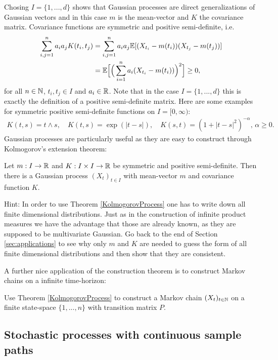 Chosing $I=\{1,...,d\}$ shows that Gaussian processes are direct generalizations of Gaussian vectors and in this case $m$ is the mean-vector and $K$ the covariance matrix. Covariance functions are symmetric and positive semi-definite, i.e.
\begin{align*}
	\sum_{i,j=1}^na_ia_jK(t_i,t_j)&=\sum_{i,j=1}^n a_ia_j \mathbb{E}[(X_{t_i}-m(t_i))(X_{t_j}-m(t_j))]\\
	&=\mathbb{E}\Big[\Big(\sum_{i=1}^n a_i(X_{t_i}-m(t_i))\Big)^2 \Big]\geq 0,
\end{align*}
for all $n\in\mathbb{N}$, $t_i, t_j\in I$ and $a_i\in \mathbb{R}$. Note that in the case $I=\{1,...,d\}$ this is exactly the definition of a positive semi-definite matrix. Here are some examples for symmetric  positive semi-definite functions on $I=[0,\infty)$:
\begin{align*}
	K(t,s)=t\wedge s, \quad K(t,s)=\exp(|t-s|),\quad K(s,t)=(1+|t-s|^2)^{-\alpha},\,\alpha\geq 0.
\end{align*}
	Gaussian processes are particularly useful as they are easy to construct through Kolmogorov's extension theorem:
\begin{luebung}
	Let $m:I\to \mathbb{R}$ and $K:I\times I\to \mathbb{R}$ be symmetric and positive semi-definite. Then there is a Gaussian process $(X_t)_{t\in I}$ with mean-vector $m$ and covariance function $K$.\smallskip

	Hint: In order to use Theorem \ref{KolmogorovProcess} one has to write down all finite dimensional distributions. Just as in the construction of infinite product measures we have the advantage that those are already known, as they are supposed to be multivariate Gaussian. Go back to the end of Section \ref{sec:applications} to see why only $m$ and $K$ are needed to guess the form of all finite dimensional distributions and then show that they are consistent.
\end{luebung}
A further nice application of the construction theorem is to construct Markov chains on a infinite time-horizon:
\begin{luebung}
	Use Theorem \ref{KolmogorovProcess} to construct a Markov chain $(X_t)_{t\in\mathbb{N}}$ on a finite state-space $\{1,...,n\}$ with transition matrix $P$.
\end{luebung}


\subsection{Stochastic processes with continuous sample paths}
\marginpar{\textcolor{red}{Lecture 21}}

